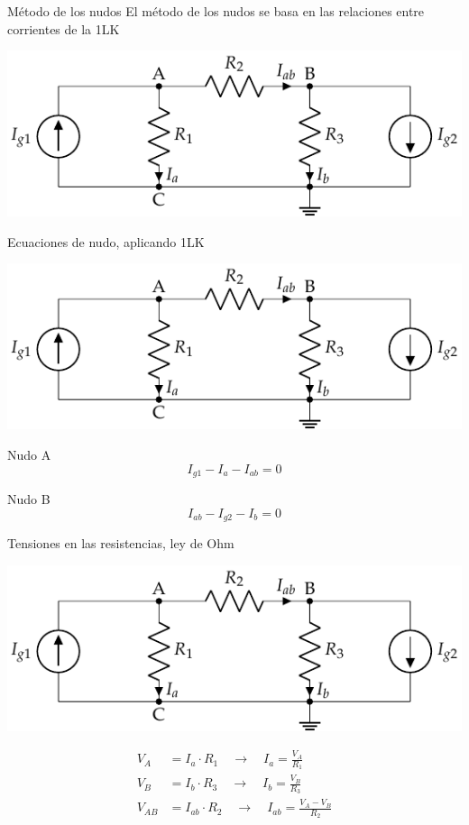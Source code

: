 \documentclass[aspectratio=169, xcolor={usenames,svgnames,dvipsnames}]{beamer}
\begin{document}
\begin{frame}{Método de los nudos}
    El \alert{método de los nudos} se basa en las relaciones entre corrientes de la 1LK
    \begin{center}
    \includegraphics[width=.8\linewidth]{../figs/nudos.pdf}
    \end{center}
\end{frame}


\begin{frame}{Ecuaciones de nudo, aplicando 1LK}
    \begin{center}
    \includegraphics[width=.8\linewidth]{../figs/nudos.pdf}
    \end{center}
    
    Nudo A
    \begin{equation*}
      I_{g1} - I_a - I_{ab} = 0
    \end{equation*}
    
    Nudo B
    \begin{equation*}
      I_{ab} - I_{g2} - I_b = 0
    \end{equation*}
\end{frame}
    

\begin{frame}{Tensiones en las resistencias, ley de Ohm}
    \begin{center}
    \includegraphics[width=.7\linewidth]{../figs/nudos.pdf}
    \end{center}
    \begin{align*}
      V_A &= I_a \cdot R_1 \quad \rightarrow \quad I_a = \frac{V_A}{R_1}\\
      V_B &= I_b \cdot R_3 \quad \rightarrow \quad I_b = \frac{V_B}{R_3}\\
      V_{AB} &= I_{ab} \cdot R_2  \quad \rightarrow \quad I_{ab} = \frac{V_A-V_B}{R_2}
    \end{align*}
\end{frame}
\end{document}
